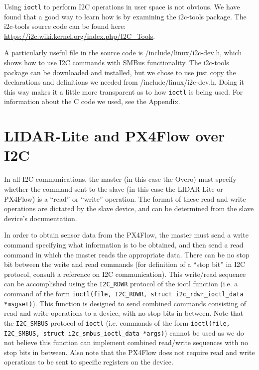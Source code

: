 \documentclass[10pt]{article}
\begin{document}
Using \texttt{ioctl} to perform I2C operations in user space is not obvious. We have found that a good way to learn how is by examining the i2c-tools package. The i2c-tools source code can be found here: \url{https://i2c.wiki.kernel.org/index.php/I2C\_Tools}.

A particularly useful file in the source code is /include/linux/i2c-dev.h, which shows how to use I2C commands with SMBus functionality. The i2c-tools package can be downloaded and installed, but we chose to use just copy the declarations and definitions we needed from /include/linux/i2c-dev.h. Doing it this way makes it a little more transparent as to how \texttt{ioctl} is being used. For information about the C code we used, see the Appendix.

\section*{LIDAR-Lite and PX4Flow over I2C}
In all I2C communications, the master (in this case the Overo) must specify whether the command sent to the slave (in this case the LIDAR-Lite or PX4Flow) is a ``read'' or ``write'' operation. The format of these read and write operations are dictated by the slave device, and can be determined from the slave device's documentation.

In order to obtain sensor data from the PX4Flow, the master must send a write command specifying what information is to be obtained, and then send a read command in which the master reads the appropriate data. There can be no stop bit between the write and read commands (for definition of a ``stop bit'' in I2C protocol, consult a reference on I2C communication). This write/read sequence can be accomplished using the \texttt{I2C\_RDWR} protocol of the ioctl function (i.e. a command of the form \texttt{ioctl(file, I2C\_RDWR, struct i2c\_rdwr\_ioctl\_data *msgset)}). This function is designed to send combined commands consisting of read and write operations to a device, with no stop bits in between. Note that the \texttt{I2C\_SMBUS} protocol of \texttt{ioctl} (i.e. commands of the form \texttt{ioctl(file, I2C\_SMBUS, struct i2c\_smbus\_ioctl\_data *args)}) cannot be used as we do not believe this function can implement combined read/write sequences with no stop bits in between. Also note that the PX4Flow does not require read and write operations to be sent to specific registers on the device.
\end{document}
